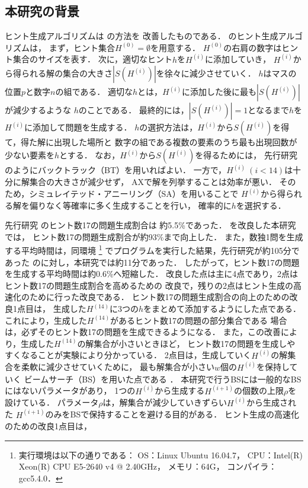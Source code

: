 \documentclass[a4paper, 9pt]{jarticle}
\begin{document}
\begin{論文概要}
\section{本研究の背景}
ヒント生成アルゴリズムは \cite{previous_research} の方法を
改善したものである．\cite{previous_research} のヒント生成アルゴリズムは，
まず，ヒント集合$H^{(0)} = \emptyset$を用意する．
$H^{(0)}$の右肩の数字はヒント集合のサイズを表す．
次に，適切なヒント$h$を$H^{(i)}$に添加していき，
$H^{(i)}$から得られる解の集合の大きさ$|S(H^{(i)})|$を徐々に減少させていく．
$h$はマスの位置$p$と数字$n$の組である．
適切な$h$とは，$H^{(i)}$に添加した後に最も$|S(H^{(i)})|$が減少するような
$h$のことである．
最終的には，$|S(H^{(i)})| = 1$となるまで$h$を$H^{(i)}$に添加して問題を生成する．
$h$の選択方法は，$H^{(i)}$から$S(H^{(i)})$を得て，得た解に出現した場所と
数字の組である複数の要素のうち最も出現回数が少ない要素を$h$とする．
なお，$H^{(i)}$から$S(H^{(i)})$を得るためには，
先行研究のようにバックトラック（BT）を用いればよい．
一方で，$H^{(i)} ~ (i < 14)$は十分に解集合の大きさが減少せず，
AXで解を列挙することは効率が悪い．
そのため，シミュレイテッド・アニーリング（SA）を用いることで
$H^{(i)}$から得られる解を偏りなく等確率に多く生成することを行い，
確率的に$h$を選択する．

先行研究 \cite{previous_research} のヒント数17の問題生成割合は
約5.5\%であった．\cite{previous_research} を改良した本研究では，
ヒント数17の問題生成割合が約93\%まで向上した．
また，数独1問を生成する平均時間は，同環境
\footnote{実行環境は以下の通りである： 
OS：Linux Ubuntu 16.04.7，
CPU：Intel(R) Xeon(R) CPU E5-2640 v4 @ 2.40GHz，
メモリ：64G，
コンパイラ：gcc5.4.0．
}
でプログラムを実行した結果，先行研究が約105分であった
のに対し，本研究では約11分であった．
したがって，ヒント数17の問題を生成する平均時間は約0.6\%へ短縮した．
改良した点は主に4点であり，2点はヒント数17の問題生成割合を高めるための
改良で，残りの2点はヒント生成の高速化のために行った改良である．
ヒント数17の問題生成割合の向上のための改良1点目は，
生成した$H^{(14)}$に3つの$h$をまとめて添加するようにした点である．
これにより，生成した$H^{(14)}$があるヒント数17の問題の部分集合である
場合は，必ずそのヒント数17の問題を生成できるようになる．
また，この改善により，生成した$H^{(14)}$の解集合が小さいときほど，
ヒント数17の問題を生成しやすくなることが実験により分かっている．
2点目は，生成していく$H^{(i)}$の解集合を柔軟に減少させていくために，
最も解集合が小さい$w$個の$H^{(i)}$を保持していく
ビームサーチ（BS）を用いた点である \cite{nagao}．
本研究で行うBSには一般的なBSにはないパラメータがあり，
1つの$H^{(i)}$から生成する$H^{(i+1)}$の個数の上限$\rho$を設けている．
パラメータ$\rho$は，解集合が減少していきずらい$H^{(i)}$から生成された
$H^{(i+1)}$のみをBSで保持することを避ける目的がある．
ヒント生成の高速化のための改良1点目は，


\end{論文概要}
\end{document}
